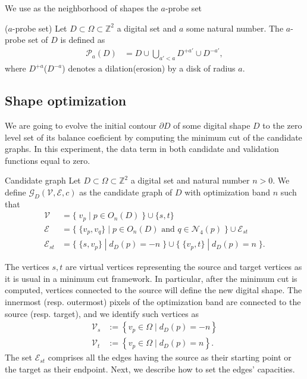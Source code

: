 \documentclass[runningheads]{llncs}
\newcommand{\daniel}[1]{ {\color{black}#1} }
\newcommand{\Ds}{D}
\begin{document}
%
We use as the neighborhood of shapes the $a$-probe set
%
\begin{definition}{($a$-probe set)}
	Let $\Ds \subset \Omega \subset \mathbb{Z}^2$ a digital set and $a$ some natural number. The $a$-probe set of $\Ds$ is defined as
	\begin{align*}
		\mathcal{P}_a(\Ds) &= \Ds \cup \bigcup_{a' < a}{\Ds^{+a'} \cup \Ds^{-a'}},
	\end{align*}
	where $\Ds^{+a}$($\Ds^{-a}$) denotes a dilation(erosion) by a disk of radius $a$.
\end{definition}
%

\daniel{
\subsection{Shape optimization}
We are going to evolve the initial contour $\partial D$ of some digital shape $D$ to the zero level set of its balance coeficient by computing the minimum cut of the candidate graphs. In this experiment, the data term in both candidate and validation functions equal to zero.}
%
\begin{definition}{Candidate graph}
Let $D \subset \Omega \subset \mathbb{Z}^2$ a digital set and natural number $n>0$. We define $\mathcal{G}_D(\mathcal{V},\mathcal{E},c)$ as the candidate graph of $D$ with optimization band $n$ such that
%
\begin{align*}
\mathcal{V} &= \big\{\; v_p \; | \; p \in O_n(D) \;\} \cup \{s,t \big\} \\
\mathcal{E} &= \big\{ \; \{v_p,v_q\} \; | \; p \in O_n(D) \text{ and } q \in \mathcal{N}_4(p) \; \big\} \cup \mathcal{E}_{st}\\
\mathcal{E}_{st} &= \big\{\; \{s,v_p\} \; | \; d_D(p)=-n \; \big\} \cup \big\{\; \{v_p,t\} \; | \; d_D(p)=n \; \big\}.
\end{align*}
%
\end{definition}

The vertices $s,t$ are virtual vertices representing the source and target vertices as it is usual in a minimum cut framework. In particular, after the minimum cut is computed, vertices connected to the source will define the new digital shape. The innermost (resp. outermost) pixels of the optimization band are connected to the source (resp. target), and we identify such vertices as
%
\begin{align*}
	\mathcal{V}_s &:=\left\{ v_p \in \Omega \; | \; d_{D}(p) = -n \right\} \\
	\mathcal{V}_t &:=\left\{ v_p \in \Omega \; | \; d_{D}(p) = n \right\}.
\end{align*}
%
The set $\mathcal{E}_{st}$ comprises all the edges having the source as their starting point or the target as their endpoint. Next, we describe how to set the edges' capacities.
\end{document}
